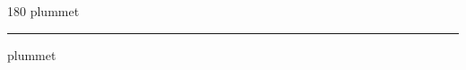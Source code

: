 
\begin{frame}
\begin{center}
\begin{turn}{180}
{\fontsize{2.5cm}{1em}\selectfont plummet}
\end{turn}
\vspace{1em}\par  
\hrule
\vspace{1em}\par  
{\fontsize{2.5cm}{1em}\selectfont plummet}
\end{center}
\end{frame}
